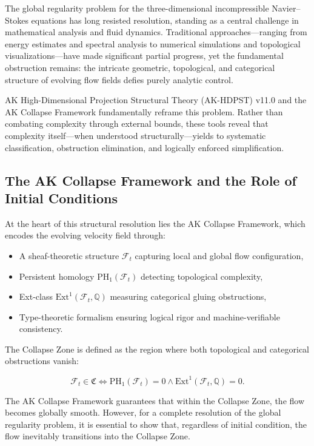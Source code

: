 \documentclass[11pt]{article}
\begin{document}
The global regularity problem for the three-dimensional incompressible Navier--Stokes equations has long resisted resolution, standing as a central challenge in mathematical analysis and fluid dynamics. Traditional approaches---ranging from energy estimates and spectral analysis to numerical simulations and topological visualizations---have made significant partial progress, yet the fundamental obstruction remains: the intricate geometric, topological, and categorical structure of evolving flow fields defies purely analytic control.

AK High-Dimensional Projection Structural Theory (AK-HDPST) v11.0 and the AK Collapse Framework fundamentally reframe this problem. Rather than combating complexity through external bounds, these tools reveal that complexity itself---when understood structurally---yields to systematic classification, obstruction elimination, and logically enforced simplification.

\subsection{The AK Collapse Framework and the Role of Initial Conditions}

At the heart of this structural resolution lies the AK Collapse Framework, which encodes the evolving velocity field through:

\begin{itemize}
  \item A sheaf-theoretic structure $\mathcal{F}_t$ capturing local and global flow configuration,
  \item Persistent homology $\mathrm{PH}_1(\mathcal{F}_t)$ detecting topological complexity,
  \item Ext-class $\mathrm{Ext}^1(\mathcal{F}_t, \mathbb{Q})$ measuring categorical gluing obstructions,
  \item Type-theoretic formalism ensuring logical rigor and machine-verifiable consistency.
\end{itemize}

The Collapse Zone is defined as the region where both topological and categorical obstructions vanish:

\begin{equation}
\mathcal{F}_t \in \mathfrak{C} \iff \mathrm{PH}_1(\mathcal{F}_t) = 0 \land \mathrm{Ext}^1(\mathcal{F}_t, \mathbb{Q}) = 0.
\end{equation}

The AK Collapse Framework guarantees that within the Collapse Zone, the flow becomes globally smooth. However, for a complete resolution of the global regularity problem, it is essential to show that, regardless of initial condition, the flow inevitably transitions into the Collapse Zone.
\end{document}
